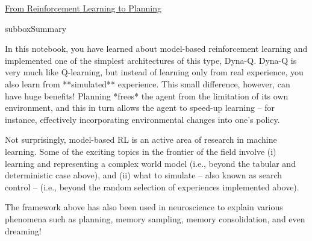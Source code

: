 \begin{textbox}{\href{https://compneuro.neuromatch.io/tutorials/W3D4_ReinforcementLearning/student/W3D4_Tutorial4.html}{From Reinforcement Learning to Planning } }
\begin{subbox}{subbox}{Summary}
\scriptsize

In this notebook, you have learned about model-based reinforcement learning and implemented one of the simplest architectures of this type, Dyna-Q. Dyna-Q is very much like Q-learning, but instead of learning only from real experience, you also learn from **simulated** experience. This small difference, however, can have huge benefits! Planning *frees* the agent from the limitation of its own environment, and this in turn allows the agent to speed-up learning -- for instance, effectively incorporating environmental changes into one's policy.

Not surprisingly, model-based RL is an active area of research in machine learning. Some of the exciting topics in the frontier of the field involve (i) learning and representing a complex world model (i.e., beyond the tabular and deterministic case above), and (ii) what to simulate -- also known as search control -- (i.e., beyond the random selection of experiences implemented above).

The framework above has also been used in neuroscience to explain various phenomena such as planning, memory sampling, memory consolidation, and even dreaming!

\end{subbox}
\end{textbox}